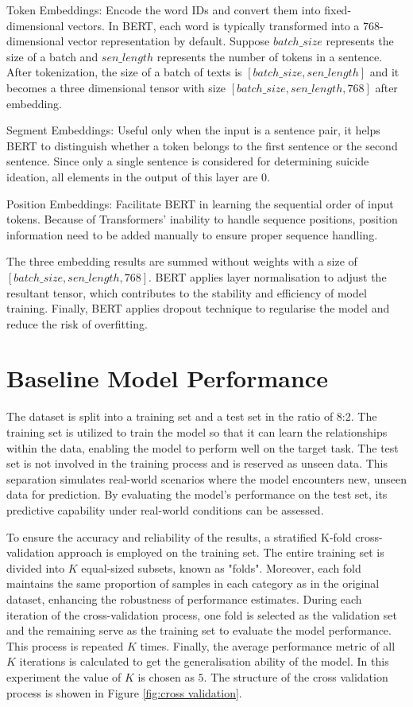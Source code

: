 \documentclass[ %
                    author={Bocheng Wang},
                supervisor={Dr. Qiang Liu},
                    degree={MSc},
                     title={A Research on Identification of Suicide Ideation in Texts with Multiple Models},
                      type={},
                      year={2024}]{dissertation}
\begin{document}
Token Embeddings: Encode the word IDs and convert them into fixed-dimensional vectors. In BERT, each word is typically transformed into a 768-dimensional vector representation by default. Suppose $batch\_size$ represents the size of a batch and $sen\_length$ represents the number of tokens in a sentence. After tokenization, the size of a batch of texts is $[batch\_size, sen\_length]$ and it becomes a three dimensional tensor with size $[batch\_size, sen\_length, 768]$ after embedding.

Segment Embeddings: Useful only when the input is a sentence pair, it helps BERT to distinguish whether a token belongs to the first sentence or the second sentence. Since only a single sentence is considered for determining suicide ideation, all elements in the output of this layer are $0$.

Position Embeddings: Facilitate BERT in learning the sequential order of input tokens. Because of Transformers' inability to handle sequence positions, position information need to be added manually to ensure proper sequence handling.

The three embedding results are summed without weights with a size of $[batch\_size, sen\_length, 768]$. BERT applies layer normalisation to adjust the resultant tensor\cite{pymars2020normalisation}, which contributes to the stability and efficiency of model training. Finally, BERT applies dropout technique to regularise the model and reduce the risk of overfitting.

\section{Baseline Model Performance}
\noindent
The dataset is split into a training set and a test set in the ratio of 8:2. The training set is utilized to train the model so that it can learn the relationships within the data, enabling the model to perform well on the target task. The test set is not involved in the training process and is reserved as unseen data. This separation simulates real-world scenarios where the model encounters new, unseen data for prediction. By evaluating the model's performance on the test set, its predictive capability under real-world conditions can be assessed.

To ensure the accuracy and reliability of the results, a stratified K-fold cross-validation approach is employed on the training set\cite{browne2000cross}. The entire training set is divided into $K$ equal-sized subsets, known as "folds". Moreover, each fold maintains the same proportion of samples in each category as in the original dataset, enhancing the robustness of performance estimates. During each iteration of the cross-validation process, one fold is selected as the validation set and the remaining serve as the training set to evaluate the model performance. This process is repeated $K$ times. Finally, the average performance metric of all $K$ iterations is calculated to get the generalisation ability of the model. In this experiment the value of $K$ is chosen as $5$. The structure of the cross validation process is showen in Figure \ref{fig:cross validation}.
\end{document}
